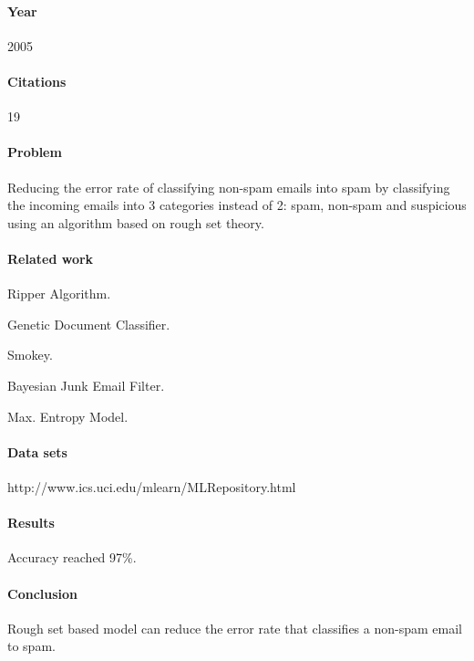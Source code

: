 \documentclass[12pt]{article}
\newenvironment{my_itemize}
{\begin{itemize}
  \setlength{\itemsep}{0cm}
  \setlength{\parskip}{0cm}}
{\end{itemize}}
\begin{document}
\paragraph{Year} 2005
\paragraph{Citations} 19

\paragraph{Problem}
\begin{my_itemize}
  \item Reducing the error rate of classifying non-spam emails into spam by classifying 
	the incoming emails into 3 categories instead of 2: spam, non-spam and suspicious
	using an algorithm based on rough set theory.
\end{my_itemize}

\paragraph{Related work}
\begin{my_itemize}
  \item Ripper Algorithm.
  \item Genetic Document Classifier.
  \item Smokey.
  \item Bayesian Junk Email Filter.
  \item Max. Entropy Model.
\end{my_itemize}

\paragraph{Data sets}
\begin{my_itemize}
  \item http://www.ics.uci.edu/mlearn/MLRepository.html
\end{my_itemize}

\paragraph{Results}
\begin{my_itemize}
  \item Accuracy reached 97\%.
\end{my_itemize}

\paragraph{Conclusion}
\begin{my_itemize}
  \item Rough set based model can reduce the error rate that classifies a non-spam email to spam.
\end{my_itemize}
\end{document}
